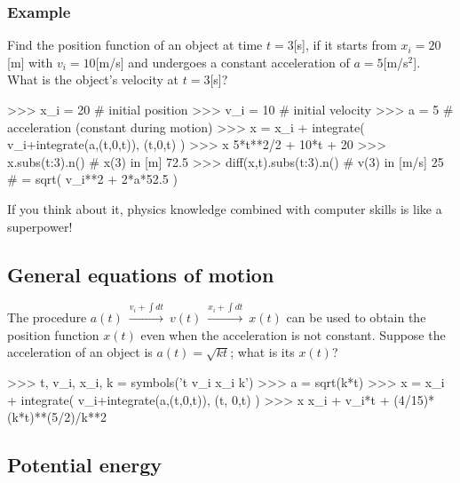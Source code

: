 \subsubsection{Example}

Find the position function of an object at time $t =3$[s], 
if it starts from $x_i=20$[m] with $v_i=10$[m/s] and undergoes 
a constant acceleration of $a=5$[m/s$^2$].
What is the object's velocity at $t=3$[s]?

\small
\begin{verbatimtab}
>>> x_i = 20   # initial position
>>> v_i = 10   # initial velocity
>>> a   = 5    # acceleration (constant during motion)
>>> x = x_i + integrate(  v_i+integrate(a,(t,0,t)),  (t,0,t) )   
>>> x
5*t**2/2 + 10*t + 20
>>> x.subs({t:3}).n()           # x(3) in [m]
72.5           
>>> diff(x,t).subs({t:3}).n()   # v(3) in [m/s]
25                              # = sqrt( v_i**2 + 2*a*52.5 )
\end{verbatimtab}
\normalsize

\noindent
If you think about it,
physics knowledge combined with computer skills is like a superpower!


\subsection{General equations of motion}
\label{mechanics:general_eqns_of_motion}

The procedure 
$a(t) \ \overset{v_i+ \int\!dt }{\longrightarrow} \ v(t) \ \overset{x_i+ \int\!dt }{\longrightarrow} \ x(t)$
can be used to obtain the position function $x(t)$ even when the acceleration is not constant.
Suppose the acceleration of an object is $a(t)=\sqrt{k t}$; 
what is its $x(t)$?

\small
\begin{verbatimtab}
>>> t, v_i, x_i, k = symbols('t v_i x_i k')
>>> a = sqrt(k*t)
>>> x = x_i + integrate( v_i+integrate(a,(t,0,t)), (t, 0,t) )
>>> x
x_i + v_i*t + (4/15)*(k*t)**(5/2)/k**2 
\end{verbatimtab}
\normalsize





\subsection{Potential energy}
\label{mechanics:potential_energy}

